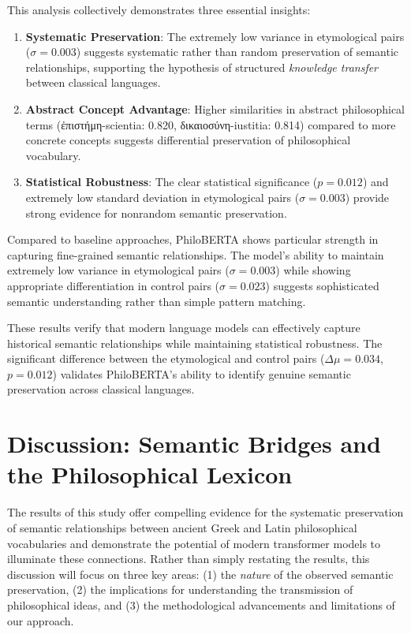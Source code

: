 \documentclass[11pt]{article} %
\begin{document}
This analysis collectively demonstrates three essential insights:

\begin{enumerate}
\item \textbf{Systematic Preservation}: The extremely low variance in etymological pairs ($\sigma = 0.003$) suggests systematic rather than random preservation of semantic relationships, supporting the hypothesis of structured \textit{knowledge transfer} between classical languages.

\item \textbf{Abstract Concept Advantage}: Higher similarities in abstract philosophical terms (\textgreek{ἐπιστήμη}-scientia: 0.820, \textgreek{δικαιοσύνη}-iustitia: 0.814) compared to more concrete concepts suggests differential preservation of philosophical vocabulary.

\item \textbf{Statistical Robustness}: The clear statistical significance ($p = 0.012$) and extremely low standard deviation in etymological pairs ($\sigma = 0.003$) provide strong evidence for nonrandom semantic preservation.
\end{enumerate}

Compared to baseline approaches, PhiloBERTA shows particular strength in capturing fine-grained semantic relationships. The model's ability to maintain extremely low variance in etymological pairs ($\sigma = 0.003$) while showing appropriate differentiation in control pairs ($\sigma = 0.023$) suggests sophisticated semantic understanding rather than simple pattern matching.

These results verify that modern language models can effectively capture historical semantic relationships while maintaining statistical robustness. The significant difference between the etymological and control pairs ($\Delta\mu = 0.034$, $p = 0.012$) validates PhiloBERTA's ability to identify genuine semantic preservation across classical languages.

\section{Discussion: Semantic Bridges and the Philosophical Lexicon}

The results of this study offer compelling evidence for the systematic preservation of semantic relationships between ancient Greek and Latin philosophical vocabularies and demonstrate the potential of modern transformer models to illuminate these connections.  Rather than simply restating the results, this discussion will focus on three key areas: (1) the \textit{nature} of the observed semantic preservation, (2) the implications for understanding the transmission of philosophical ideas, and (3) the methodological advancements and limitations of our approach.
\end{document}
